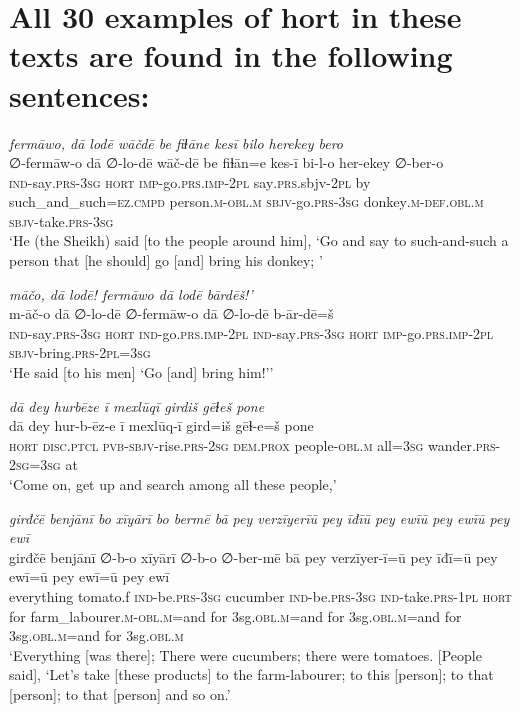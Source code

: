 \chapter{All 30 examples of hort in these texts are found in the following sentences:}

\ea \label{HB.11}
\textit{fermāwo, dā lodē wāčdē be fiɫāne kesī bilo herekey bero} \\ 
\gll ∅-fermāw-o dā ∅-lo-dē wāč-dē be fiɫān=e kes-ī bi-l-o her-ekey ∅-ber-o \\ 
 \textsc{ind-}say\textsc{.prs}\textsc{-3sg} \textsc{hort} \textsc{imp-}go\textsc{.prs}\textsc{.imp}\textsc{-2pl} say\textsc{.prs}.sbjv\textsc{-2pl} by such\_and\_such\textsc{=ez}\textsc{.cmpd} person\textsc{.m}\textsc{-obl}\textsc{.m} \textsc{sbjv-}go\textsc{.prs}\textsc{-3sg} donkey\textsc{.m}\textsc{-def}\textsc{.obl}\textsc{.m} \textsc{sbjv-}take\textsc{.prs}\textsc{-3sg} \\ 
\glt `He (the Sheikh) said [to the people around him], ‘Go and say to such-and-such a person that [he should] go [and] bring his donkey; '
\z 
 
\ea \label{HB.79}
\textit{māčo, dā lodē! fermāwo dā lodē bārdēš!’} \\ 
\gll m-āč-o dā ∅-lo-dē ∅-fermāw-o dā ∅-lo-dē b-ār-dē=š \\ 
 \textsc{ind-}say\textsc{.prs}\textsc{-3sg} \textsc{hort} \textsc{ind-}go\textsc{.prs}\textsc{.imp}\textsc{-2pl} \textsc{ind-}say\textsc{.prs}\textsc{-3sg} \textsc{hort} \textsc{imp-}go\textsc{.prs}\textsc{.imp}\textsc{-2pl} \textsc{sbjv-}bring\textsc{.prs}\textsc{-2pl}\textsc{=3sg} \\ 
\glt `He said [to his men] ‘Go [and] bring him!’'
\z 
 
\ea \label{HB.90}
\textit{dā dey hurbēze ī mexlūqī girdiš gēɫeš pone} \\ 
\gll dā dey hur-b-ēz-e ī mexlūq-ī gird=iš gēɫ-e=š pone \\ 
 \textsc{hort} \textsc{disc.ptcl} \textsc{pvb-}\textsc{sbjv-}rise\textsc{.prs}-\textsc{2sg} \textsc{dem.prox} people\textsc{-obl}\textsc{.m} all\textsc{=3sg} wander\textsc{.prs}-\textsc{2sg}\textsc{=3sg} at \\ 
\glt `Come on, get up and search among all these people,'
\z 
 
\ea \label{PM.43}
\textit{girđčē benjānī bo xīyārī bo bermē bā pey verzīyerīū pey īđīū pey ewīū pey ewīū pey ewī} \\ 
\gll girđčē benjānī ∅-b-o xīyārī ∅-b-o ∅-ber-mē bā pey verzīyer-ī=ū pey īđī=ū pey ewī=ū pey ewī=ū pey ewī \\ 
 everything tomato.f \textsc{ind-}be\textsc{.prs}\textsc{-3sg} cucumber \textsc{ind-}be\textsc{.prs}\textsc{-3sg} \textsc{ind-}take\textsc{.prs}\textsc{-1pl} \textsc{hort} for farm\_labourer\textsc{.m}\textsc{-obl}\textsc{.m}=and for 3sg\textsc{.obl}\textsc{.m}=and for 3sg\textsc{.obl}\textsc{.m}=and for 3sg\textsc{.obl}\textsc{.m}=and for 3sg\textsc{.obl}\textsc{.m} \\ 
\glt `Everything [was there]; There were cucumbers; there were tomatoes. [People said], ‘Let’s take [these products] to the farm-labourer; to this [person]; to that [person]; to that [person] and so on.'
\z 
 
